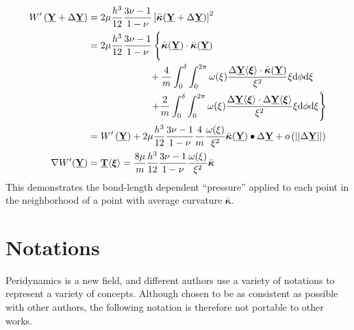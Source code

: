 \begin{align}
    W'\left(\vstate{Y}{}{}+\Delta\vstate{Y}{}{}\right) &=2\mu\frac{h^3}{12}\frac{3\nu-1}{1-\nu}\left[\bar{\boldsymbol{\kappa}}\!\left(\vstate{Y}{}{}+\Delta\vstate{Y}{}{}\right)\right]^2 \notag \\
    &=2\mu\frac{h^3}{12}\frac{3\nu-1}{1-\nu} \left\{ \vphantom{\int_0^\delta} \bar{\boldsymbol{\kappa}}\!\left(\vstate{Y}{}{}\right) \cdot \bar{\boldsymbol{\kappa}}\!\left(\vstate{Y}{}{}\right)\right. \notag \\
    &\phantom{=2\mu\frac{h^3}{12}\frac{3\nu-1}{1-\nu}} + \frac{4}{m} \int_0^\delta \int_0^{2\pi}\omega(\xi)\frac{\Delta\vstate{Y}{}{\boldsymbol{\xi}}\cdot \bar{\boldsymbol{\kappa}}\!\left(\vstate{Y}{}{}\right)}{\xi^2} \xi {\rm d}\phi {\rm d}\xi \notag \\
    &\phantom{=2\mu\frac{h^3}{12}\frac{3\nu-1}{1-\nu}}\left. + \frac{2}{m} \int_0^\delta \int_0^{2\pi}\omega(\xi)\frac{\Delta\vstate{Y}{}{\boldsymbol{\xi}}\cdot \Delta\vstate{Y}{}{\boldsymbol{\xi}}}{\xi^2} \xi {\rm d}\phi {\rm d}\xi\right\} \notag \\
    &=W'\left(\vstate{Y}{}{}\right)+ 2\mu\frac{h^3}{12}\frac{3\nu-1}{1-\nu} \frac{4}{m} \frac{\omega(\xi)}{\xi^2} \bar{\boldsymbol{\kappa}}\!\left(\vstate{Y}{}{}\right) \bullet \Delta\vstate{Y}{}{} + o\left(||\Delta\vstate{Y}{}{}||\right)\notag \\
    \nabla W'\!\left(\vstate{Y}{}{}\right) &= \vstate{T}{}{\boldsymbol{\xi}} =  \frac{8 \mu}{m} \frac{h^3}{12}\frac{3\nu-1}{1-\nu}\frac{\omega(\xi)}{\xi^2} \bar{\boldsymbol{\kappa}}\notag
\end{align}
%
This demonstrates the bond-length dependent ``pressure'' applied to each point in the neighborhood of a point with average curvature $\bar{\boldsymbol{\kappa}}$.




\chapter{Notations }

Peridynamics is a new field, and different authors use a variety of notations to represent a variety of concepts.
Although chosen to be as consistent as possible with other authors, the following notation is therefore not portable to other works.

